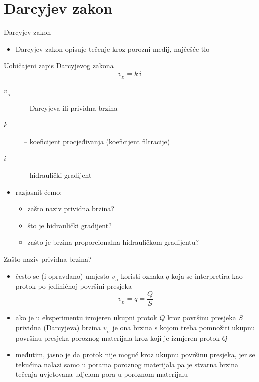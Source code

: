 \documentclass{beamer}
\begin{document}
\naslovnislajd

\section{Darcyjev zakon}
\begin{frame}{Darcyjev zakon}
\begin{itemize}
\item Darcyjev zakon opisuje tečenje kroz porozni medij, najčešće tlo 
\end{itemize}
\begin{block}{Uobičajeni zapis Darcyjevog zakona}
\[
v_{{\scriptscriptstyle _{D}}}=k\,i
\]
\begin{description}
\item [{$v_{{\scriptscriptstyle _{D}}}$}] -- Darcyjeva ili prividna brzina 
\item [{$k$}] -- koeficijent procjeđivanja (koeficijent filtracije) 
\item [{$i$}] -- hidraulički gradijent \smallskip{}
\end{description}
\end{block}
\begin{itemize}
\item razjasnit ćemo:
\begin{itemize}
\item zašto naziv prividna brzina? 
\item što je hidraulički gradijent? 
\item zašto je brzina proporcionalna hidrauličkom gradijentu? 
\end{itemize}
\end{itemize}
\end{frame}
%
\begin{frame}{Zašto naziv prividna brzina?}
\begin{itemize}
\item često se (i opravdano) umjesto $v_{{\scriptscriptstyle _{D}}}$ koristi
oznaka $q$ koja se interpretira kao protok po jediničnoj površini
presjeka 
\[
v_{{\scriptscriptstyle _{D}}}=q=\frac{Q}{S}
\]
\item ako je u eksperimentu izmjeren ukupni protok $Q$ kroz površinu presjeka
$S$ prividna (Darcyjeva) brzina $v_{{\scriptscriptstyle _{D}}}$
je ona brzina s kojom treba pomnožiti ukupnu površinu presjeka poroznog
materijala kroz koji je izmjeren protok $Q$ 
\item međutim, jasno je da protok nije moguć kroz ukupnu površinu presjeka,
jer se tekućina nalazi samo u porama poroznog materijala pa je stvarna
brzina tečenja uvjetovana udjelom pora u poroznom materijalu 
\end{itemize}
\end{frame}
\end{document}
